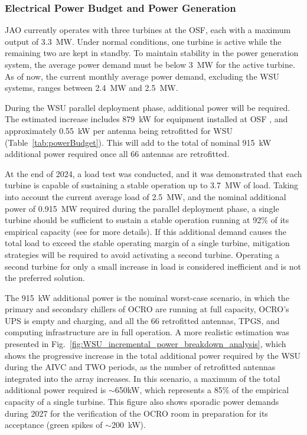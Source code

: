 \subsubsection{Electrical Power Budget and Power Generation}
\label{sec:powerBudget}

\ac{JAO} currently operates with three turbines at the \ac{OSF}, each with a maximum output of 3.3~MW. Under normal conditions, one turbine is active while the remaining two are kept in standby. To maintain stability in the power generation system, the average power demand must be below 3~MW for the active turbine.
As of now, the current monthly average power demand, excluding the \ac{WSU} systems, ranges between 2.4~MW and 2.5~MW.   

During the \ac{WSU} parallel deployment phase, additional power will be required. The estimated increase includes 879~kW for equipment installed at \ac{OSF} \cite{OCRO_DSN}, and approximately 0.55~kW per antenna being retrofitted for \ac{WSU} (Table~\ref{tab:powerBudget}). This will add to the total of nominal 915~kW additional power required once all 66 antennas are retrofitted. 



At the end of 2024, a load test was conducted, and it was demonstrated that each turbine is capable of sustaining a stable operation up to 3.7~MW of load. Taking into account the current average load of 2.5~MW, and the nominal additional power of 0.915~MW required during the parallel deployment phase, a single turbine should be sufficient to sustain a stable operation running at 92\% of its empirical capacity (see \cite{WSU_rollout_plan} for more details). If this additional demand causes the total load to exceed the stable operating margin of a single turbine, mitigation strategies will be required to avoid activating a second turbine. Operating a second turbine for only a small increase in load is considered inefficient and is not the preferred solution. 

The 915~kW additional power is the nominal worst-case scenario, in which the primary and secondary chillers of OCRO are running at full capacity, OCRO's UPS is empty and charging, and all the 66 retrofitted antennas, TPGS, and computing infrastructure are in full operation. A more realistic estimation was presented in
Fig.~\ref{fig:WSU_incremental_power_breakdown_analysis}, which shows the progressive increase in the total additional power required by the WSU during the \ac{AIVC} and \ac{TWO} periods, as the number of retrofitted antennas integrated into the array increases. In this scenario, a maximum of the total additional power required is $\sim$650kW, which represents a 85\% of the empirical capacity of a single turbine. This figure also shows sporadic power demands during 2027 for the verification of the OCRO room in preparation for its acceptance (green spikes of $\sim$200~kW). 


